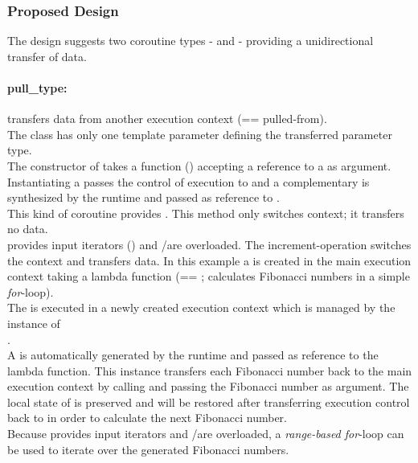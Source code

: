 
\subsubsection*{Proposed Design}
The design suggests two coroutine types - \pushcoro and \pullcoro - providing a
unidirectional transfer of data.

\paragraph*{pull\_type:}
\pullcoro transfers data from another execution context (== pulled-from).\\
The class has only one template parameter defining the transferred parameter
type.\\
The constructor of \pullcoro takes a function (\corofunction) accepting a
reference to a \pushcoro as argument. Instantiating a \pullcoro passes the
control of execution to \corofunction and a complementary \pushcoro is
synthesized by the runtime and passed as reference to \corofunction.\\
\newline
This kind of coroutine provides \pullcoroop. This method only switches
context; it transfers no data.\\
\newline
\pullcoro provides input iterators (\pullcoroiterator) and \bgin/\ed are overloaded. The
increment-operation switches the context and transfers data.
In this example a \pullcoro is created in the main execution context taking a
lambda function (== \corofunction; calculates Fibonacci numbers in a simple
\textit{for}-loop).\\
The \corofunction is executed in a newly created execution context which is
managed by the instance of\\
\pullcoro.\\
A \pushcoro is automatically generated by the runtime and passed as reference to
the lambda function. This \pushcoro instance transfers each Fibonacci number back
to the main execution context by calling \pushcoroop and passing the Fibonacci
number as argument. The local state of \corofunction is preserved and will be
restored after transferring execution control back to \corofunction in order to
calculate the next Fibonacci number.\\
Because \pullcoro provides input iterators and \bgin/\ed are overloaded, a
\textit{range-based for}-loop can be used to iterate over the generated
Fibonacci numbers.

